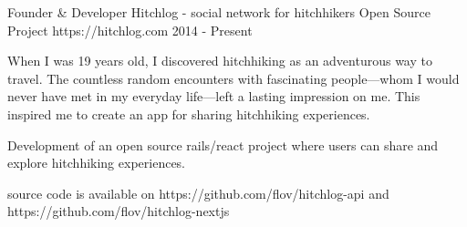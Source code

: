 \begin{cventries}

  \cventry
    {Founder \& Developer} %
    {Hitchlog - social network for hitchhikers} %
    {Open Source Project} %
    {https://hitchlog.com} %
    {2014 - Present} %
    {
      \begin{cvitems} %
        \item When I was 19 years old, I discovered hitchhiking as an adventurous way to travel. The countless random encounters with fascinating people—whom I would never have met in my everyday life—left a lasting impression on me. This inspired me to create an app for sharing hitchhiking experiences.
        \item Development of an open source rails/react project where users can share and explore hitchhiking experiences.
        \item source code is available on https://github.com/flov/hitchlog-api and https://github.com/flov/hitchlog-nextjs
      \end{cvitems}
    }
\end{cventries}
